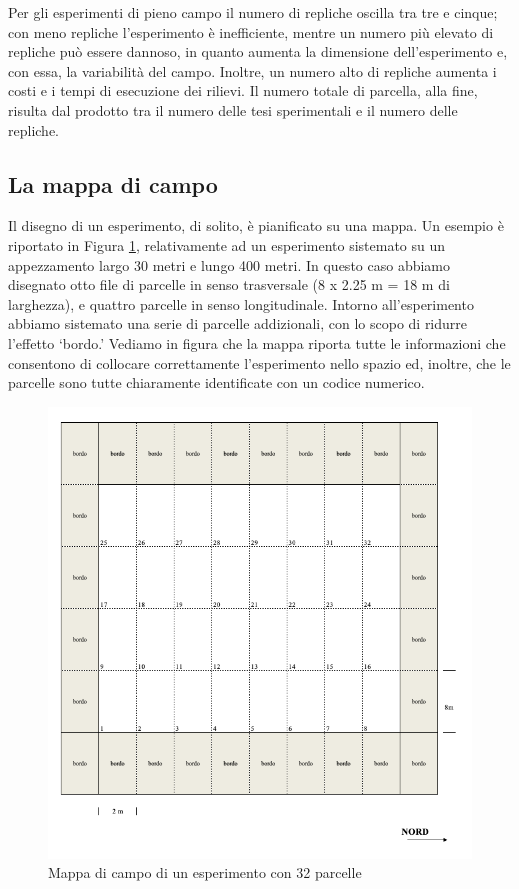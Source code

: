 \documentclass[a4paper,12pt,oneside]{book}
\begin{document}
Per gli esperimenti di pieno campo il numero di repliche oscilla tra tre e cinque; con meno repliche l'esperimento è inefficiente, mentre un numero più elevato di repliche può essere dannoso, in quanto aumenta la dimensione dell'esperimento e, con essa, la variabilità del campo. Inoltre, un numero alto di repliche aumenta i costi e i tempi di esecuzione dei rilievi. Il numero totale di parcella, alla fine, risulta dal prodotto tra il numero delle tesi sperimentali e il numero delle repliche.

\hypertarget{la-mappa-di-campo}{%
\subsection{La mappa di campo}\label{la-mappa-di-campo}}

Il disegno di un esperimento, di solito, è pianificato su una mappa. Un esempio è riportato in Figura \ref{fig:figName31}, relativamente ad un esperimento sistemato su un appezzamento largo 30 metri e lungo 400 metri. In questo caso abbiamo disegnato otto file di parcelle in senso trasversale (8 x 2.25 m = 18 m di larghezza), e quattro parcelle in senso longitudinale. Intorno all'esperimento abbiamo sistemato una serie di parcelle addizionali, con lo scopo di ridurre l'effetto `bordo.' Vediamo in figura che la mappa riporta tutte le informazioni che consentono di collocare correttamente l'esperimento nello spazio ed, inoltre, che le parcelle sono tutte chiaramente identificate con un codice numerico.

\begin{figure}

{\centering \includegraphics[width=0.9\linewidth]{_images/Mappa1} 

}

\caption{Mappa di campo di un esperimento con 32 parcelle}\label{fig:figName31}
\end{figure}
\end{document}
